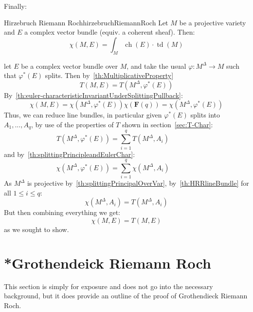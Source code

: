 \documentclass{book}
\newenvironment{Proof}[1][]
  {\begin{ProofTcb}[#1]}
  {\end{ProofTcb}}
\renewcommand{\phi}{\varphi}
\newcommand{\ch}{{\operatorname{ch}}}
\newcommand{\td}{{\operatorname{td}}}
\renewcommand{\ch}{{\operatorname{ch}}}
\begin{document}
Finally:

\begin{thm}{Hirzebruch Riemann Roch}{hirzebruchRiemannRoch}
  Let $M$ be a projective variety and $E$ a complex vector bundle (equiv. a coherent sheaf). Then:
  \[
    \chi(M, E) = \int_M \ch(E)\cdot \td(M)
  \]
\end{thm}

\begin{Proof}
  let $E$ be a complex vector bundle over $M$, and take the usual $\phi: M^\Delta \to
  M$ such that $\phi^*(E)$ splits. Then by~\cref{th:MultiplicativeProperty}
  \[
    T(M, E) = T(M^\Delta, \phi^*(E))
  \]
  By~\cref{th:euler-characteristicInvariantUnderSplittingPullback}:
  \[
    \chi(M, E) = \chi(M^\Delta, \phi^*(E))\chi(\mathbf{F}(q)) = \chi(M^\Delta, \phi^*(E))
  \]
  Thus, we can reduce line bundles, in particular given $\phi^*(E)$ splits into $A_1, ..., A_q$, by use of the
  properties of $T$ shown in section~\ref{sec:T-Char}:
  \[
    T(M^\Delta, \phi^*(E))  = \sum_{i=1}^q T(M^\Delta, A_i) \qquad \text{} \qquad
  \]
  and by~\cref{th:splittingPrincipleandEulerChar}:
  \[
    \chi(M^\Delta, \phi^*(E))   = \sum_{i=1}^q \chi(M^\Delta, A_i) \qquad \text{} \qquad
  \]
  As $M^\Delta$ is projective by~\cref{th:splittingPrincipalOverVar}, by~\cref{th:HRRlineBundle} for all $1 \le i \le q$:
  \[
    \chi(M^\Delta, A_i) = T(M^\Delta, A_i)
  \]
  But then combining everything we get:
  \[
    \chi(M,E) = T(M, E)
  \]
  as we sought to show.
\end{Proof}


\section{*Grothendeick Riemann Roch}\label{sec:GRR}

This section is simply for exposure and does not go into the necessary background, but it does provide an
outline of the proof of Grothendieck Riemann Roch.
\end{document}
